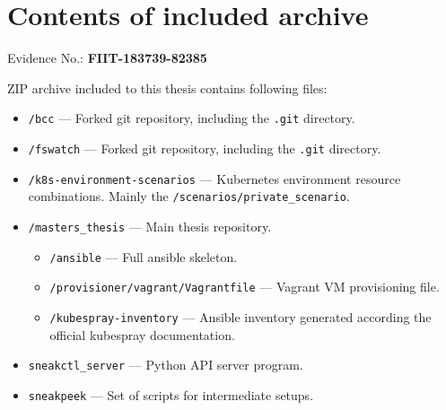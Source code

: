 \setcounter{figure}{0}
\setcounter{listing}{0}
\appendixpagenumbering

\chapter{Contents of included archive \label{appendix:contents} }

Evidence No.: \textbf{FIIT-183739-82385}

ZIP archive included to this thesis contains following files:

\begin{itemize}[noitemsep]
\item \texttt{/bcc} --- Forked git repository, including the \texttt{.git} directory.
\item \texttt{/fswatch} --- Forked git repository, including the \texttt{.git} directory.
\item \texttt{/k8s-environment-scenarios} --- Kubernetes environment resource combinations. Mainly the \texttt{/scenarios/private\_scenario}.
\item \texttt{/masters\_thesis} --- Main thesis repository.
\begin{itemize}
	\item \texttt{/ansible} --- Full ansible skeleton.
	\item \texttt{/provisioner/vagrant/Vagrantfile} --- Vagrant VM provisioning file.
	\item \texttt{/kubespray-inventory} --- Ansible inventory generated according the official kubespray documentation.
\end{itemize}
\item \texttt{sneakctl\_server} --- Python API server program.
\item \texttt{sneakpeek} --- Set of scripts for intermediate setups.
\end{itemize}


